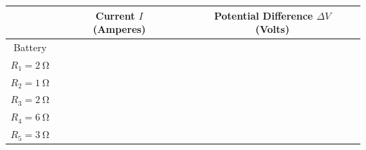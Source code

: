 \documentclass[10pt]{exam}
\begin{document}
\begin{questions}


  
    \vs 

    \renewcommand{\arraystretch}{2.5}
    \begin{flushright}
      \begin{tabular}{ccccccc}
        && Current $I$ (Amperes) &&& Potential Difference $\Delta V$ (Volts) &\\
        \hline\hline
        Battery \\\hline
        $R_1= \SI{2}{\ohm}$ \\\hline
        $R_2= \SI{1}{\ohm}$ \\\hline
        $R_3= \SI{2}{\ohm}$ \\\hline
        $R_4= \SI{6}{\ohm}$ \\\hline
        $R_5= \SI{3}{\ohm}$ \\\hline
      \end{tabular}
    \end{flushright}





\end{questions}
\end{document}
